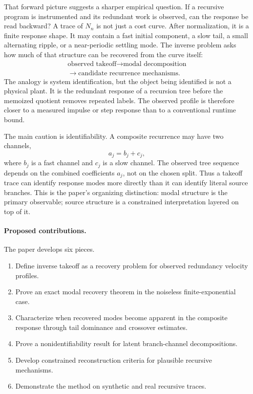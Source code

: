 \documentclass[10pt,twocolumn]{article}
\begin{document}
That forward picture suggests a sharper empirical question. If a recursive
program is instrumented and its redundant work is observed, can the response be
read backward? A trace of \(N_n\) is not just a cost curve. After normalization,
it is a finite response shape. It may contain a fast initial component, a slow
tail, a small alternating ripple, or a near-periodic settling mode. The inverse
problem asks how much of that structure can be recovered from the curve itself:
\[
        \begin{gathered}
        \text{observed takeoff}
        \longrightarrow
        \text{modal decomposition}
        \\
        \longrightarrow
        \text{candidate recurrence mechanisms}.
        \end{gathered}
\]
The analogy is system identification, but the object being identified is not a
physical plant. It is the redundant response of a recursion tree before the
memoized quotient removes repeated labels. The observed profile is therefore
closer to a measured impulse or step response than to a conventional runtime
bound.

The main caution is identifiability. A composite recurrence may have two
channels,
\[
        a_j=b_j+c_j,
\]
where \(b_j\) is a fast channel and \(c_j\) is a slow channel. The observed tree
sequence depends on the combined coefficients \(a_j\), not on the chosen split.
Thus a takeoff trace can identify response modes more directly than it can
identify literal source branches. This is the paper's organizing distinction:
modal structure is the primary observable; source structure is a constrained
interpretation layered on top of it.

\paragraph{Proposed contributions.}
The paper develops six pieces.
\begin{enumerate}
    \item Define inverse takeoff as a recovery problem for observed redundancy
    velocity profiles.
    \item Prove an exact modal recovery theorem in the noiseless
    finite-exponential case.
    \item Characterize when recovered modes become apparent in the composite
    response through tail dominance and crossover estimates.
    \item Prove a nonidentifiability result for latent branch-channel
    decompositions.
    \item Develop constrained reconstruction criteria for plausible recursive
    mechanisms.
    \item Demonstrate the method on synthetic and real recursive traces.
\end{enumerate}
\end{document}
